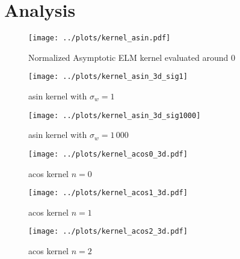 \section{Analysis}

\begin{figure}
    \texttt{[image: ../plots/kernel\_asin.pdf]}
    \caption{Normalized Asymptotic ELM kernel evaluated around 0}
\end{figure}

\begin{figure}
    \texttt{[image: ../plots/kernel\_asin\_3d\_sig1]}
    \caption{asin kernel with $\sigma_w=1$}
\end{figure}

\begin{figure}
    \texttt{[image: ../plots/kernel\_asin\_3d\_sig1000]}
    \caption{asin kernel with $\sigma_w=1\,000$}
\end{figure}


\begin{figure}
    \texttt{[image: ../plots/kernel\_acos0\_3d.pdf]}
    \caption{acos kernel $n=0$}
\end{figure}

\begin{figure}
    \texttt{[image: ../plots/kernel\_acos1\_3d.pdf]}
    \caption{acos kernel $n=1$}
\end{figure}

\begin{figure}
    \texttt{[image: ../plots/kernel\_acos2\_3d.pdf]}
    \caption{acos kernel $n=2$}
\end{figure}
